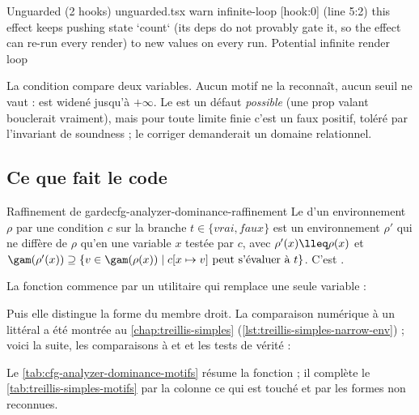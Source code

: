 \begin{sortie}
  Unguarded  (2 hooks)  unguarded.tsx
    warn   infinite-loop  [hook:0]  (line 5:2)  this effect keeps pushing state `count` (its deps do not provably gate it, so the effect can re-run every render) to new values on every run. Potential infinite render loop
\end{sortie}

La condition compare deux variables. Aucun motif ne la reconnaît, aucun seuil
ne vaut  :  est widené jusqu'à $+\infty$. Le
\Warning{} est un défaut \emph{possible} (une prop  valant
 bouclerait vraiment), mais pour toute limite finie c'est un
faux positif, toléré par l'invariant de soundness ; le corriger demanderait un
domaine relationnel.

\subsection{Ce que fait le code}

\begin{definition}{Raffinement de garde}{cfg-analyzer-dominance-raffinement}
  Le  d'un environnement $\rho$ par une condition
  $c$ sur la branche $t \in \{\mathit{vrai}, \mathit{faux}\}$ est un
  environnement $\rho'$ qui ne diffère de $\rho$ qu'en une variable $x$
  testée par $c$, avec $\rho'(x) \lleq \rho(x)$ et
  $\gam(\rho'(x)) \supseteq \{ v \in \gam(\rho(x)) \mid c[x \mapsto v]
  \text{ peut s'évaluer à } t \}$. C'est .
\end{definition}

La fonction commence par un utilitaire qui remplace une seule variable :


Puis elle distingue la forme du membre droit. La comparaison numérique à un
littéral a été montrée au \cref{chap:treillis-simples}
(\cref{lst:treillis-simples-narrow-env}) ; voici la suite, les comparaisons à
 et  et les tests de vérité :


Le \cref{tab:cfg-analyzer-dominance-motifs} résume la fonction ; il complète
le \cref{tab:treillis-simples-motifs} par la colonne \og ce qui est
touché\fg{} et par les formes non reconnues.

